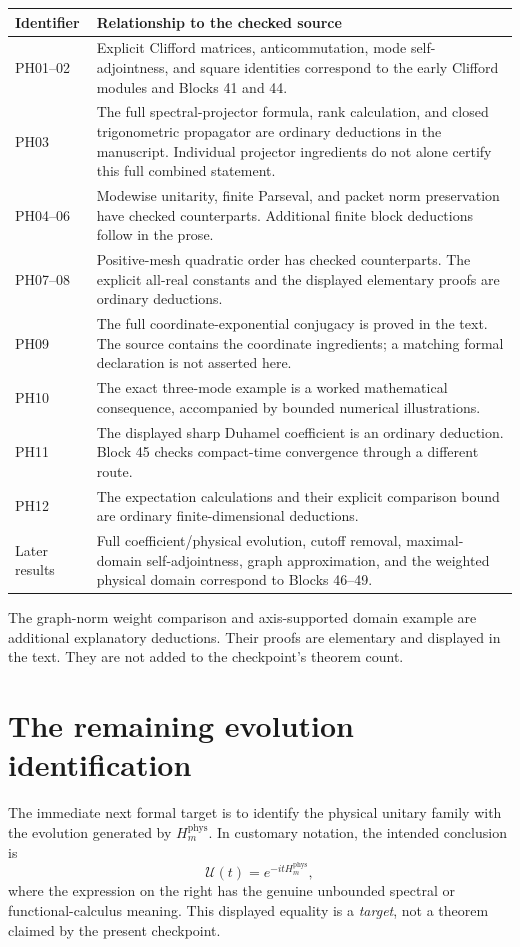\begin{longtable}{@{}L{.12\linewidth}L{.79\linewidth}@{}}
\toprule
Identifier & Relationship to the checked source\\\midrule\endhead
PH01--02 & Explicit Clifford matrices, anticommutation, mode self-adjointness, and square identities correspond to the early Clifford modules and Blocks 41 and 44.\\
PH03 & The full spectral-projector formula, rank calculation, and closed trigonometric propagator are ordinary deductions in the manuscript. Individual projector ingredients do not alone certify this full combined statement.\\
PH04--06 & Modewise unitarity, finite Parseval, and packet norm preservation have checked counterparts. Additional finite block deductions follow in the prose.\\
PH07--08 & Positive-mesh quadratic order has checked counterparts. The explicit all-real constants and the displayed elementary proofs are ordinary deductions.\\
PH09 & The full coordinate-exponential conjugacy is proved in the text. The source contains the coordinate ingredients; a matching formal declaration is not asserted here.\\
PH10 & The exact three-mode example is a worked mathematical consequence, accompanied by bounded numerical illustrations.\\
PH11 & The displayed sharp Duhamel coefficient is an ordinary deduction. Block 45 checks compact-time convergence through a different route.\\
PH12 & The expectation calculations and their explicit comparison bound are ordinary finite-dimensional deductions.\\
Later results & Full coefficient/physical evolution, cutoff removal, maximal-domain self-adjointness, graph approximation, and the weighted physical domain correspond to Blocks 46--49.\\
\bottomrule
\end{longtable}

The graph-norm weight comparison and axis-supported domain example are additional explanatory deductions. Their proofs are elementary and displayed in the text. They are not added to the checkpoint's theorem count.

\section{The remaining evolution identification}
The immediate next formal target is to identify the physical unitary family with the evolution generated by $H_m^{\mathrm{phys}}$. In customary notation, the intended conclusion is
\[
\mathcal U(t)=e^{-itH_m^{\mathrm{phys}}},
\]
where the expression on the right has the genuine unbounded spectral or functional-calculus meaning. This displayed equality is a \emph{target}, not a theorem claimed by the present checkpoint.


